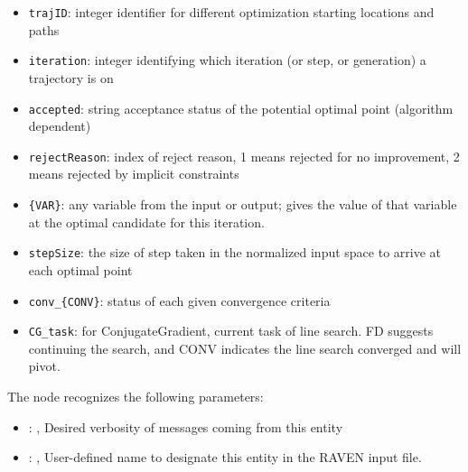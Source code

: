         \begin{itemize}
          \item \texttt{trajID}: integer identifier for different optimization starting locations and paths
             \item \texttt{iteration}: integer identifying which iteration (or step, or generation) a trajectory is on
             \item \texttt{accepted}: string acceptance status of the potential optimal point (algorithm dependent)
             \item \texttt{rejectReason}: index of reject reason, 1 means rejected for no improvement, 2 means rejected by implicit constraints
             \item \texttt{\{VAR\}}: any variable from the  input or output; gives the value of that variable at the optimal candidate for this iteration.
             \item \texttt{stepSize}: the size of step taken in the normalized input space to arrive at each optimal point
             \item \texttt{conv\_\{CONV\}}: status of each given convergence criteria
             \item \texttt{CG\_task}: for ConjugateGradient, current task of line search. FD suggests continuing the search, and CONV indicates the line search converged and will pivot.

         \end{itemize}

  The  node recognizes the following parameters:
    \begin{itemize}
      \item {}: ,
        Desired verbosity of messages coming from this entity
      \item {}: ,
        User-defined name to designate this entity in the RAVEN input file.
  \end{itemize}

